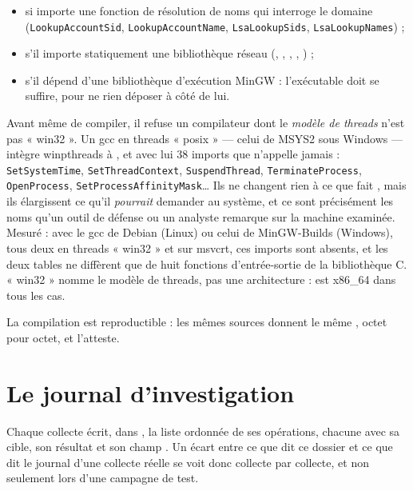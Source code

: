 \documentclass[11pt,a4paper,oneside]{report}
\begin{document}
\begin{itemize}
  \item si  importe une fonction de résolution de noms qui
        interroge le domaine (\texttt{LookupAccountSid},
        \texttt{LookupAccountName}, \texttt{LsaLookupSids},
        \texttt{LsaLookupNames}) ;
  \item s'il importe statiquement une bibliothèque réseau
        (, , ,
        , ) ;
  \item s'il dépend d'une bibliothèque d'exécution MinGW : l'exécutable doit se
        suffire, pour ne rien déposer à côté de lui.
\end{itemize}

Avant même de compiler, il refuse un compilateur dont le \emph{modèle de
threads} n'est pas « win32 ». Un gcc en threads « posix » — celui de MSYS2
sous Windows — intègre winpthreads à , et avec lui 38
imports que \wac{} n'appelle jamais : \texttt{SetSystemTime},
\texttt{SetThreadContext}, \texttt{SuspendThread},
\texttt{TerminateProcess}, \texttt{OpenProcess},
\texttt{SetProcessAffinityMask}\ldots{} Ils ne changent rien à ce que fait
\wac{}, mais ils élargissent ce qu'il \emph{pourrait} demander au système, et
ce sont précisément les noms qu'un outil de défense ou un analyste remarque
sur la machine examinée. Mesuré : avec le gcc de Debian (Linux) ou celui de
MinGW-Builds (Windows), tous deux en threads « win32 » et sur msvcrt, ces
imports sont absents, et les deux tables ne diffèrent que de huit fonctions
d'entrée-sortie de la bibliothèque C. « win32 » nomme le modèle de threads,
pas une architecture :  est x86\_64 dans tous les cas.

La compilation est reproductible : les mêmes sources donnent le même
, octet pour octet, et  l'atteste.

\section{Le journal d'investigation}

Chaque collecte écrit, dans , la liste ordonnée
de ses opérations, chacune avec sa cible, son résultat et son champ
. Un écart entre ce que dit ce dossier et ce que dit le
journal d'une collecte réelle se voit donc collecte par collecte, et non
seulement lors d'une campagne de test.
\end{document}
